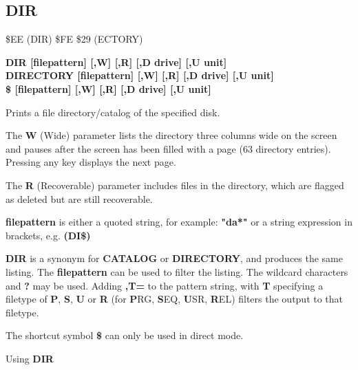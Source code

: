
\newpage
\subsection{DIR}
\begin{description}[leftmargin=2cm,style=nextline]
\item [Token:] \$EE (DIR) \$FE \$29 (ECTORY)
\item [Format:] {\bf DIR [filepattern] [,W] [,R] [,D drive] [,U unit] } \\
		{\bf DIRECTORY [filepattern] [,W] [,R] [,D drive] [,U unit] } \\
		{\bf \$ [filepattern] [,W] [,R] [,D drive] [,U unit] }
\item [Usage:]  Prints a file directory/catalog of the specified disk.

   The {\bf W} (Wide) parameter lists the directory three columns wide
   on the screen and pauses after the screen has been filled with a page
   (63 directory entries). Pressing any key displays the next page.

   The {\bf R} (Recoverable) parameter includes files in the
   directory, which are flagged as deleted but are still
   recoverable.

   {\bf filepattern} is either a quoted string, for example: {\bf "da*"} or
   a string expression in brackets, e.g. {\bf (DI\$)}

   \drivedefinition

   \unitdefinition

\item [Remarks:]
   {\bf DIR} is a synonym for {\bf CATALOG}
   or {\bf DIRECTORY}, and produces the same listing.
   The {\bf filepattern} can be used to filter the listing.
   The wildcard characters {\bf *} and {\bf ?} may be used.
   Adding {\bf ,T=} to the pattern string, with {\bf T} specifying
   a filetype of {\bf P}, {\bf S}, {\bf U} or {\bf R}
   (for {\bf P}RG, {\bf S}EQ, {\bf U}SR, {\bf R}EL) filters the
   output to that filetype.

   The shortcut symbol {\bf \$} can only be used in direct mode.

\item [Examples:] Using {\bf DIR}


%
%
%
%
%


\end{description}
